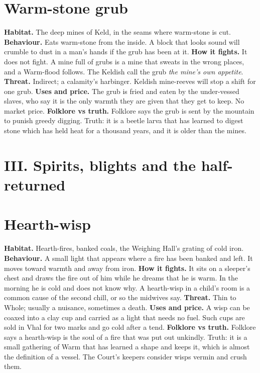 \documentclass{design/chronicle}
\begin{document}
\section*{Warm-stone grub}

\textbf{Habitat.} The deep mines of Keld, in the seams where warm-stone is cut. \textbf{Behaviour.} Eats warm-stone from the inside. A block that looks sound will crumble to dust in a man’s hands if the grub has been at it. \textbf{How it fights.} It does not fight. A mine full of grubs is a mine that sweats in the wrong places, and a Warm-flood follows. The Keldish call the grub \emph{the mine’s own appetite}. \textbf{Threat.} Indirect; a calamity’s harbinger. Keldish mine-reeves will stop a shift for one grub. \textbf{Uses and price.} The grub is fried and eaten by the under-vessed slaves, who say it is the only warmth they are given that they get to keep. No market price. \textbf{Folklore vs truth.} Folklore says the grub is sent by the mountain to punish greedy digging. Truth: it is a beetle larva that has learned to digest stone which has held heat for a thousand years, and it is older than the mines.

\CRrule

\section*{III. Spirits, blights and the half-returned}

\section*{Hearth-wisp}

\textbf{Habitat.} Hearth-fires, banked coals, the Weighing Hall’s grating of cold iron. \textbf{Behaviour.} A small light that appears where a fire has been banked and left. It moves toward warmth and away from iron. \textbf{How it fights.} It sits on a sleeper’s chest and draws the fire out of him while he dreams that he is warm. In the morning he is cold and does not know why. A hearth-wisp in a child’s room is a common cause of the second chill, or so the midwives say. \textbf{Threat.} Thin to Whole; usually a nuisance, sometimes a death. \textbf{Uses and price.} A wisp can be coaxed into a clay cup and carried as a light that needs no fuel. Such cups are sold in Vhal for two marks and go cold after a tend. \textbf{Folklore vs truth.} Folklore says a hearth-wisp is the soul of a fire that was put out unkindly. Truth: it is a small gathering of Warm that has learned a shape and keeps it, which is almost the definition of a vessel. The Court’s keepers consider wisps vermin and crush them.
\end{document}
